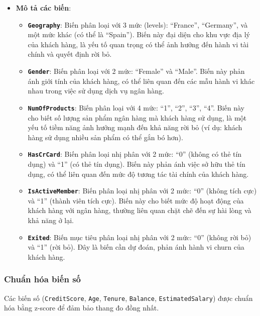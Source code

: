 \documentclass[
]{article}
\providecommand{\tightlist}{%
  \setlength{\itemsep}{0pt}\setlength{\parskip}{0pt}}
\begin{document}
\begin{itemize}
\tightlist
\item
  \textbf{Mô tả các biến}:

  \begin{itemize}
  \tightlist
  \item
    \textbf{\texttt{Geography}}: Biến phân loại với 3 mức (levels):
    ``France'', ``Germany'', và một mức khác (có thể là ``Spain''). Biến
    này đại diện cho khu vực địa lý của khách hàng, là yếu tố quan trọng
    có thể ảnh hưởng đến hành vi tài chính và quyết định rời bỏ.
  \item
    \textbf{\texttt{Gender}}: Biến phân loại với 2 mức: ``Female'' và
    ``Male''. Biến này phản ánh giới tính của khách hàng, có thể liên
    quan đến các mẫu hành vi khác nhau trong việc sử dụng dịch vụ ngân
    hàng.
  \item
    \textbf{\texttt{NumOfProducts}}: Biến phân loại với 4 mức: ``1'',
    ``2'', ``3'', ``4''. Biến này cho biết số lượng sản phẩm ngân hàng
    mà khách hàng sử dụng, là một yếu tố tiềm năng ảnh hưởng mạnh đến
    khả năng rời bỏ (ví dụ: khách hàng sử dụng nhiều sản phẩm có thể gắn
    bó hơn).
  \item
    \textbf{\texttt{HasCrCard}}: Biến phân loại nhị phân với 2 mức:
    ``0'' (không có thẻ tín dụng) và ``1'' (có thẻ tín dụng). Biến này
    phản ánh việc sở hữu thẻ tín dụng, có thể liên quan đến mức độ tương
    tác tài chính của khách hàng.
  \item
    \textbf{\texttt{IsActiveMember}}: Biến phân loại nhị phân với 2 mức:
    ``0'' (không tích cực) và ``1'' (thành viên tích cực). Biến này cho
    biết mức độ hoạt động của khách hàng với ngân hàng, thường liên quan
    chặt chẽ đến sự hài lòng và khả năng ở lại.
  \item
    \textbf{\texttt{Exited}}: Biến mục tiêu phân loại nhị phân với 2
    mức: ``0'' (không rời bỏ) và ``1'' (rời bỏ). Đây là biến cần dự
    đoán, phản ánh hành vi churn của khách hàng.
  \end{itemize}
\end{itemize}

\subsubsection{Chuẩn hóa biến số}\label{sec-scaling}

Các biến số (\texttt{CreditScore}, \texttt{Age}, \texttt{Tenure},
\texttt{Balance}, \texttt{EstimatedSalary}) được chuẩn hóa bằng z-score
để đảm bảo thang đo đồng nhất.
\end{document}
